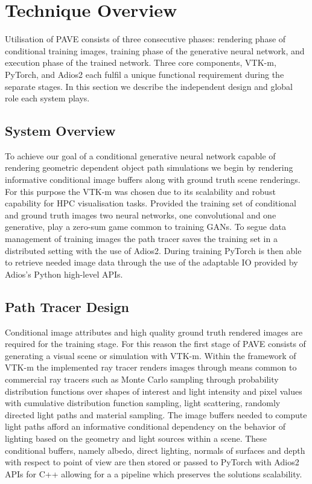 \documentclass[sigconf,authordraft]{acmart}%
\begin{document}
\section{Technique Overview}

Utilisation of PAVE consists of three consecutive phases: rendering phase of conditional training images, training phase of the generative neural network, and execution phase of the trained network. Three core components, VTK-m, PyTorch, and Adios2 each fulfil a unique functional requirement during the separate stages. In this section we describe the independent design and global role each system plays.

\subsection{System Overview}
 
To achieve our goal of a conditional generative neural network capable of rendering geometric dependent object path simulations we begin by rendering informative conditional image buffers along with ground truth scene renderings. For this purpose the VTK-m was chosen due to its scalability and robust capability for HPC visualisation tasks. Provided the training set of conditional and ground truth images two neural networks, one convolutional and one generative, play a zero-sum game common to training GANs. To segue data management of training images the path tracer saves the training set in a distributed setting with the use of Adios2. During training PyTorch is then able to retrieve needed image data through the use of the adaptable IO provided by Adios's Python high-level APIs.

\subsection{Path Tracer Design}

Conditional image attributes and high quality ground truth rendered images are required for the training stage. For this reason the first stage of PAVE consists of generating a visual scene or simulation with VTK-m. Within the framework of VTK-m the implemented ray tracer renders images through means common to commercial ray tracers such as Monte Carlo sampling through probability distribution functions over shapes of interest and light intensity and pixel values with cumulative distribution function sampling, light scattering, randomly directed light paths and material sampling. The image buffers needed to compute light paths afford an informative conditional dependency on the behavior of lighting based on the geometry and light sources within a scene. These conditional buffers, namely albedo, direct lighting, normals of surfaces and depth with respect to point of view are then stored or passed to PyTorch with Adios2 APIs for C++ allowing for a a pipeline which preserves the solutions scalability. 
\end{document}
